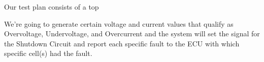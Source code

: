 Our test plan consists of a top

We’re going to generate certain voltage and current values that qualify as Overvoltage, Undervoltage, and Overcurrent and the system will set the signal for the Shutdown Circuit and report each specific fault to the ECU with which specific cell(s) had the fault.
